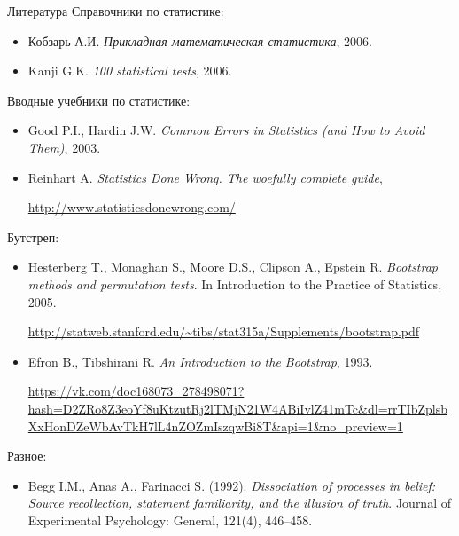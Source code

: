 \documentclass[11pt,pdf,utf8,hyperref={unicode},aspectratio=169]{beamer}
\begin{document}
\begin{frame}[allowframebreaks]{Литература}
        Справочники по статистике:
        \begin{itemize}
            \item Кобзарь А.И. \textit{Прикладная математическая статистика}, 2006.
            \item Kanji G.K. \textit{100 statistical tests}, 2006.
        \end{itemize}

        Вводные учебники по статистике:
        \begin{itemize}
            \item Good P.I., Hardin J.W. \textit{Common Errors in Statistics (and How to Avoid Them)}, 2003.
            \item Reinhart A. \textit{Statistics Done Wrong. The woefully complete guide}, \small{\url{http://www.statisticsdonewrong.com/}\par}
        \end{itemize}
        Бутстреп:
        \begin{itemize}
            \item Hesterberg T., Monaghan S., Moore D.S., Clipson A., Epstein R. \textit{Bootstrap methods and permutation tests}. In Introduction to the Practice of Statistics, 2005. \small{\url{http://statweb.stanford.edu/~tibs/stat315a/Supplements/bootstrap.pdf}\par}
            \item Efron B., Tibshirani R. \textit{An Introduction to the Bootstrap}, 1993.
            \small{\url{https://vk.com/doc168073_278498071?hash=D2ZRo8Z3eoYf8uKtzutRj2lTMjN21W4ABiIvlZ41mTc&dl=rrTIbZplsbXxHonDZeWbAvTkH7lL4nZOZmIszqwBi8T&api=1&no_preview=1}\par}
        \end{itemize}

%

        \framebreak
        Разное:
        \begin{itemize}
            \item Begg I.M., Anas A., Farinacci S. (1992). \textit{Dissociation of processes in belief: Source recollection, statement familiarity, and the illusion of truth}. Journal of Experimental Psychology: General, 121(4), 446–458.


\end{itemize}
\end{frame}
\end{document}
